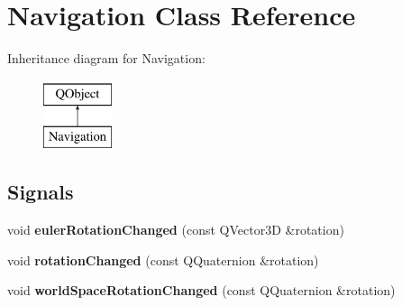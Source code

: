 \hypertarget{class_navigation}{}\section{Navigation Class Reference}
\label{class_navigation}
Inheritance diagram for Navigation\+:\begin{figure}[H]
\begin{center}
\leavevmode
\includegraphics[height=2.000000cm]{class_navigation}
\end{center}
\end{figure}
\subsection*{Signals}
\begin{DoxyCompactItemize}
\item 
\hypertarget{class_navigation_a46da025077023f9c225d3f5dfe870324}{}void {\bfseries euler\+Rotation\+Changed} (const Q\+Vector3\+D \&rotation)\label{class_navigation_a46da025077023f9c225d3f5dfe870324}

\item 
\hypertarget{class_navigation_ac54fe5d8be2858c2988a9f5158d2d58e}{}void {\bfseries rotation\+Changed} (const Q\+Quaternion \&rotation)\label{class_navigation_ac54fe5d8be2858c2988a9f5158d2d58e}

\item 
\hypertarget{class_navigation_aa8de8f9227de65da000d1ce730821bab}{}void {\bfseries world\+Space\+Rotation\+Changed} (const Q\+Quaternion \&rotation)\label{class_navigation_aa8de8f9227de65da000d1ce730821bab}

\end{DoxyCompactItemize}
